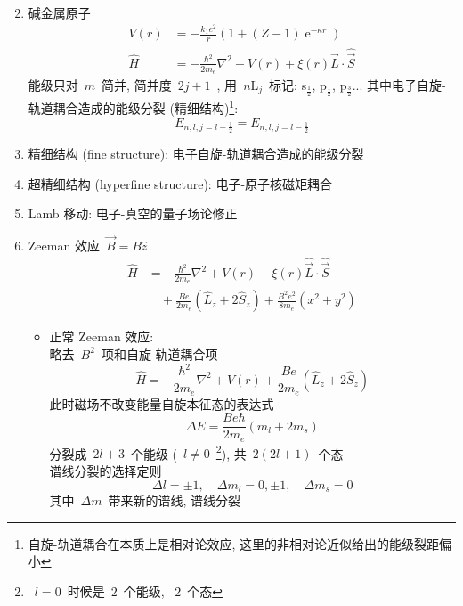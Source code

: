\documentclass[11pt,a4paper,twocolumn,fleqn]{article}%
\DeclareMathOperator{\e}{e}%
\renewcommand{\[}{~$}
\renewcommand{\]}{$~}%
\begin{document}
\begin{enumerate}
\begin{align}
  	\end{align}
  \item 碱金属原子
  	\begin{align}
  	 V(r) &= -\frac{k_1 e^2}{r}\left(1+(Z-1)\e^{-\kappa r}\right) \\
  	 \hat H &= -\frac{\hbar^2}{2m_e}\nabla^
  	 2 + V(r) + \xi(r)\hat{\vec L}\cdot\hat{\vec S}
  	\end{align}
  	能级只对\[m\]简并, 简并度\[2j+1\], 用\[n\mathrm L_j\]标记: s$_{\frac 12}$, p$_{\frac 12}$, p$_{\frac 32}$... 其中电子自旋-轨道耦合造成的能级分裂 (精细结构)\footnote{自旋-轨道耦合在本质上是相对论效应, 这里的非相对论近似给出的能级裂距偏小}: 
  	\begin{equation}
  	 E_{n,l,j=l+\frac 12} = E_{n,l,j=l-\frac 12}
  	\end{equation}
  \item 精细结构 (fine structure): 电子自旋-轨道耦合造成的能级分裂
  \item 超精细结构 (hyperfine structure): 电子-原子核磁矩耦合
  \item Lamb 移动: 电子-真空的量子场论修正
  \item Zeeman 效应\[\vec B = B\hat{z}\]
  	\begin{align}
  	 \hat H &= -\frac{\hbar^2}{2m_e}\nabla^2 + V(r) + \xi(r)\hat{\vec L}\cdot\hat{\vec S} \nonumber\\
  	 & \quad + \frac{Be}{2m_e}(\hat L_z + 2\hat S_z) + \frac{B^2e^2}{8m_e}(x^2+y^2)
  	\end{align}
  	\begin{itemize}
	  	\item 正常 Zeeman 效应: \\
	  	略去\[B^2\]项和自旋-轨道耦合项
	  	\begin{equation}
	  	 \hat H = -\frac{\hbar^2}{2m_e}\nabla^2 + V(r) + \frac{Be}{2m_e}(\hat L_z + 2\hat S_z)
	  	\end{equation}
	  	此时磁场不改变能量自旋本征态的表达式
	  	\begin{equation}
	  	 \Delta E = \frac{Be\hbar}{2m_e}(m_l+2m_s)
	  	\end{equation}
	  	分裂成\[2l+3\]个能级 (\[l\neq 0\]\footnote{\[l=0\]时候是\[2\]个能级, \[2\]个态}), 共\[2(2l+1)\]个态 \\
	  	谱线分裂的选择定则
	  	\begin{equation}
	  	 \Delta l = \pm 1, \quad \Delta m_l = 0,\pm 1, \quad\Delta m_s = 0
	  	\end{equation}
	  	其中\[\Delta m\]带来新的谱线, 谱线分裂
	  	\begin{equation}

\end{equation}
\end{itemize}
\end{enumerate}
\end{document}
